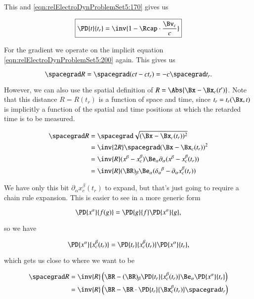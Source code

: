This and \ref{eqn:relElectroDynProblemSet5:170} gives us

\begin{equation}\label{eqn:relElectroDynProblemSet5:240}
\boxed{
\PD{t}{t_r} = \inv{ 1 -\Rcap \cdot \frac{\Bv_c}{c} }
}
\end{equation}

For the gradient we operate on the implicit equation \ref{eqn:relElectroDynProblemSet5:200} again.  This gives us

\begin{equation}\label{eqn:relElectroDynProblemSet5:300}
\spacegrad R = \spacegrad (c t - c t_r) = - c \spacegrad t_r.
\end{equation}

However, we can also use the spatial definition of $R = \Abs{\Bx - \Bx_c(t')}$.  Note that this distance $R = R(t_r)$ is a function of space and time, since $t_r = t_r(\Bx, t)$ is implicitly a function of the spatial and time positions at which the retarded time is to be measured.

\begin{align*}
\spacegrad R 
&=
\spacegrad \sqrt{(\Bx - \Bx_c(t_r))^2} \\
&=
\inv{2R} \spacegrad (\Bx - \Bx_c(t_r))^2 \\
&=
\inv{R} (x^\beta - x_c^\beta) \Be_\alpha \partial_\alpha (x^\beta - x_c^\beta(t_r)) \\
&=
\inv{R} (\BR)_\beta \Be_\alpha ({\delta_\alpha}^\beta - \partial_\alpha x_c^\beta(t_r)) \\
\end{align*}

We have only this bit $\partial_\alpha x_c^\beta(t_r)$ to expand, but that's just going to require a chain rule expansion.  This is easier to see in a more generic form

\begin{equation}\label{eqn:relElectroDynProblemSet5:320}
\PD{x^\alpha}{f(g)} = \PD{g}{f} \PD{x^\alpha}{g},
\end{equation}

so we have

\begin{equation}\label{eqn:relElectroDynProblemSet5:340}
\PD{x^\alpha}{x_c^\beta(t_r)} = \PD{t_r}{x_c^\beta(t_r)} \PD{x^\alpha}{t_r},
\end{equation}

which gets us close to where we want to be

\begin{align*}
\spacegrad R
&=
\inv{R} \left(\BR - (\BR)_\beta \PD{t_r}{x_c^\beta(t_r)} \Be_\alpha \PD{x^\alpha}{t_r} \right) \\
&=
\inv{R} \left(\BR - \BR \cdot \PD{t_r}{\Bx_c^\beta(t_r)} \spacegrad t_r \right)
\end{align*}

